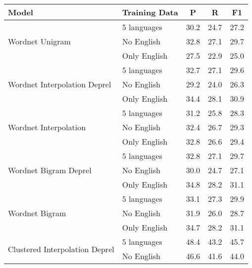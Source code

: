 \begin{table}[htbp]
\centering
\begin{tabular}{llccc}
\textbf{Model} & \textbf{Training Data} & \textbf{P} & \textbf{R} & \textbf{F1} \\
\hline
\multirow{3}{*}{ Wordnet Unigram }                & 5 languages  & 30.2      & 24.7   & 27.2    \\
                                                  & No English   & 32.8      & 27.1   & 29.7    \\
                                                  & Only English & 27.5      & 22.9   & 25.0    \\
\hline
\multirow{3}{*}{ Wordnet Interpolation Deprel }   & 5 languages  & 32.7      & 27.1   & 29.6    \\
                                                  & No English   & 29.2      & 24.0   & 26.3    \\
                                                  & Only English & 34.4      & 28.1   & 30.9    \\
\hline
\multirow{3}{*}{ Wordnet Interpolation  }         & 5 languages  & 31.2      & 25.8   & 28.3    \\
                                                  & No English   & 32.4      & 26.7   & 29.3    \\
                                                  & Only English & 32.8      & 26.6   & 29.4    \\
\hline
\multirow{3}{*}{ Wordnet Bigram Deprel }          & 5 languages  & 32.8      & 27.1   & 29.7    \\
                                                  & No English   & 30.0      & 24.7   & 27.1    \\
                                                  & Only English & 34.8      & 28.2   & 31.1    \\
\hline
\multirow{3}{*}{ Wordnet Bigram }                 & 5 languages  & 33.1      & 27.3   & 29.9    \\
                                                  & No English   & 31.9      & 26.0   & 28.7    \\
                                                  & Only English & 34.7      & 28.2   & 31.1    \\
\hline
\multirow{3}{*}{ Clustered Interpolation Deprel } & 5 languages  & 48.4      & 43.2   & 45.7    \\
                                                  & No English   & 46.6      & 41.6   & 44.0    \\

\end{tabular}
\end{table}

